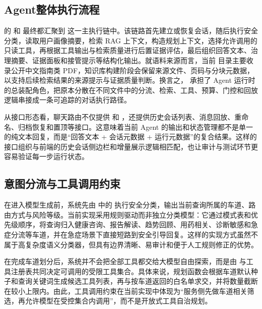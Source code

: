 \subsection{Agent整体执行流程}

 的  和  最终都汇聚到  这一主执行链中。该链路首先建立或恢复会话，随后执行安全分类，读取用户画像摘要，检索 RAG 上下文\cite{zhang2025medicalrag}，构造规划上下文，选择允许调用的只读工具，再根据工具输出与检索质量进行后置证据评估，最后组织回答文本、治理摘要、证据面板和接管提示等结构化输出。就语料来源而言，当前  目录主要收录公开中文指南类 PDF，知识库构建阶段会保留来源文件、页码与分块元数据，以支持后续检索结果的来源提示与证据质量判断\cite{cds2020t2d_guideline,hypertension2024cn,lipid2023cn,ckd2022cn,dietary2022cn,physicalactivity2021cn}。换言之， 承担了 Agent 运行时的总装配角色，把原本分散在不同文件中的分流、检索、工具、预算、门控和回放逻辑串接成一条可追踪的对话执行路径。

从接口形态看，聊天路由不仅提供  和 ，还提供历史会话列表、消息回放、重命名、归档恢复和置顶等接口。这意味着当前 Agent 的输出和状态管理都不是单一的纯文本回复，而是“回答文本 + 会话元数据 + 运行元数据”的复合结果。这样的接口组织与前端的历史会话侧边栏和增量展示逻辑相匹配，也让审计与测试环节更容易验证每一步运行状态。

\subsection{意图分流与工具调用约束}
\label{sec:lane_engine_impl}

在进入模型生成前，系统先由  中的  执行安全分类，输出当前查询所属的车道、路由方式与风险等级。当前实现采用规则驱动而非独立分类模型：它通过模式表和优先级顺序，将查询归入健康咨询、报告解读、趋势回顾、用药相关、诊断敏感和急症分流等车道，并在急症场景下直接短路到安全引导回复。这样的实现方式虽然不属于高复杂度语义分类器，但具有边界清晰、易审计和便于人工规则修正的优势。

在完成车道划分后，系统并不会把全部工具都交给大模型自由探索，而是由  与工具注册表共同决定可调用的受限工具集合。具体来说，规划函数会根据车道默认种子和查询关键词生成候选工具列表，再与按车道返回的白名单求交，并将数量截断在较小上限内。由此，工具调用约束在当前实现中体现为“服务侧先做车道相关筛选，再允许模型在受控集合内调用”，而不是开放式工具自治规划。

